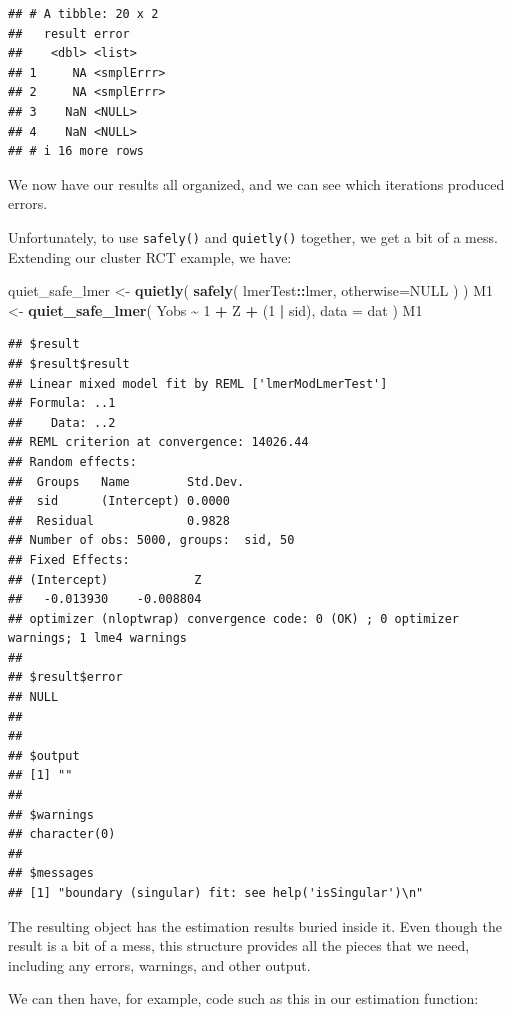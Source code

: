 \documentclass[
]{book}
\newenvironment{Shaded}{\begin{snugshade}}{\end{snugshade}}
\newcommand{\AttributeTok}[1]{\textcolor[rgb]{0.13,0.29,0.53}{#1}}
\newcommand{\ConstantTok}[1]{\textcolor[rgb]{0.56,0.35,0.01}{#1}}
\newcommand{\DecValTok}[1]{\textcolor[rgb]{0.00,0.00,0.81}{#1}}
\newcommand{\FunctionTok}[1]{\textcolor[rgb]{0.13,0.29,0.53}{\textbf{#1}}}
\newcommand{\NormalTok}[1]{#1}
\newcommand{\OtherTok}[1]{\textcolor[rgb]{0.56,0.35,0.01}{#1}}
\newcommand{\SpecialCharTok}[1]{\textcolor[rgb]{0.81,0.36,0.00}{\textbf{#1}}}
\begin{document}
\begin{verbatim}
## # A tibble: 20 x 2
##   result error     
##    <dbl> <list>    
## 1     NA <smplErrr>
## 2     NA <smplErrr>
## 3    NaN <NULL>    
## 4    NaN <NULL>    
## # i 16 more rows
\end{verbatim}

We now have our results all organized, and we can see which iterations produced errors.

Unfortunately, to use \texttt{safely()} and \texttt{quietly()} together, we get a bit of a mess.
Extending our cluster RCT example, we have:

\begin{Shaded}
\begin{Highlighting}[]
\NormalTok{quiet\_safe\_lmer }\OtherTok{\textless{}{-}} \FunctionTok{quietly}\NormalTok{( }\FunctionTok{safely}\NormalTok{( lmerTest}\SpecialCharTok{::}\NormalTok{lmer, }\AttributeTok{otherwise=}\ConstantTok{NULL}\NormalTok{ ) )}
\NormalTok{M1 }\OtherTok{\textless{}{-}} \FunctionTok{quiet\_safe\_lmer}\NormalTok{( Yobs }\SpecialCharTok{\textasciitilde{}} \DecValTok{1} \SpecialCharTok{+}\NormalTok{ Z }\SpecialCharTok{+}\NormalTok{ (}\DecValTok{1} \SpecialCharTok{|}\NormalTok{ sid), }\AttributeTok{data =}\NormalTok{ dat )}
\NormalTok{M1}
\end{Highlighting}
\end{Shaded}

\begin{verbatim}
## $result
## $result$result
## Linear mixed model fit by REML ['lmerModLmerTest']
## Formula: ..1
##    Data: ..2
## REML criterion at convergence: 14026.44
## Random effects:
##  Groups   Name        Std.Dev.
##  sid      (Intercept) 0.0000  
##  Residual             0.9828  
## Number of obs: 5000, groups:  sid, 50
## Fixed Effects:
## (Intercept)            Z  
##   -0.013930    -0.008804  
## optimizer (nloptwrap) convergence code: 0 (OK) ; 0 optimizer warnings; 1 lme4 warnings 
## 
## $result$error
## NULL
## 
## 
## $output
## [1] ""
## 
## $warnings
## character(0)
## 
## $messages
## [1] "boundary (singular) fit: see help('isSingular')\n"
\end{verbatim}

The resulting object has the estimation results buried inside it.
Even though the result is a bit of a mess, this structure provides all the pieces that we need, including any errors, warnings, and other output.

We can then have, for example, code such as this in our estimation function:
\end{document}
